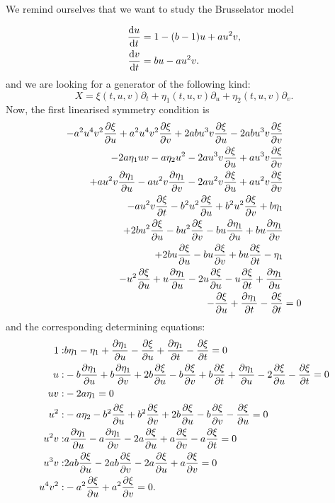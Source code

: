 We remind ourselves that we want to study the Brusselator model

\begin{equation*}
  \begin{split}
    \dv{u}{t}&=1-(b-1)u+au^2 v,\\
    \dv{v}{t}&=bu-au^2 v.\\
    \end{split}
\end{equation*}
and we are looking for a generator of the following kind:
\begin{equation}
X=\xi(t,u,v)\partial_t+\eta_1(t,u,v)\partial_u+\eta_2(t,u,v)\partial_v.
\end{equation}
Now, the first linearised symmetry condition is
\begin{align}
  - a^{2} u^{4} v^{2} \pdv{\xi}{u} + a^{2} u^{4} v^{2} \pdv{\xi}{v} + 2 a b u^{3} v \pdv{\xi}{u} - 2 a b u^{3} v \pdv{\xi}{v}&\nonumber\\
  - 2 a \eta_1 u v - a \eta_2 u^{2} - 2 a u^{3} v \pdv{\xi}{u} + a u^{3} v \pdv{\xi}{v}&\nonumber\\
  + a u^{2} v \pdv{\eta_1}{u} - a u^{2} v \pdv{\eta_1}{v} - 2 a u^{2} v \pdv{\xi}{u} + a u^{2} v \pdv{\xi}{v}&\nonumber\\
  - a u^{2} v \pdv{\xi}{t} - b^{2} u^{2} \pdv{\xi}{u} + b^{2} u^{2} \pdv{\xi}{v} + b \eta_1&\nonumber\\
  + 2 b u^{2} \pdv{\xi}{u} - b u^{2} \pdv{\xi}{v} - b u \pdv{\eta_1}{u} + b u \pdv{\eta_1}{v} &\nonumber\\
  + 2 b u \pdv{\xi}{u} - b u \pdv{\xi}{v} + b u \pdv{\xi}{t} - \eta_1&\nonumber\\
  - u^{2} \pdv{\xi}{u} + u \pdv{\eta_1}{u} - 2 u \pdv{\xi}{u} - u \pdv{\xi}{t} + \pdv{\eta_1}{u}&\nonumber\\
  - \pdv{\xi}{u} + \pdv{\eta_1}{t} - \pdv{\xi}{t}&=0\label{eq:Brusselator_lin_sym_1}
\end{align}
and the corresponding determining equations:
\begin{align*}
1:&b \eta_1 - \eta_1 + \pdv{\eta_1}{u} - \pdv{\xi}{u} + \pdv{\eta_1}{t} - \pdv{\xi}{t}=0\\
u:&- b \pdv{\eta_1}{u} + b \pdv{\eta_1}{v} + 2 b \pdv{\xi}{u} - b \pdv{\xi}{v} + b \pdv{\xi}{t} + \pdv{\eta_1}{u} - 2 \pdv{\xi}{u} - \pdv{\xi}{t}=0\\
u v:&- 2 a \eta_1=0\\
u^{2}:&- a \eta_2 - b^{2} \pdv{\xi}{u} + b^{2} \pdv{\xi}{v} + 2 b \pdv{\xi}{u} - b \pdv{\xi}{v} - \pdv{\xi}{u}=0\\
u^{2} v:&a \pdv{\eta_1}{u} - a \pdv{\eta_1}{v} - 2 a \pdv{\xi}{u} + a \pdv{\xi}{v} - a \pdv{\xi}{t}=0\\
u^{3} v:&2 a b \pdv{\xi}{u} - 2 a b \pdv{\xi}{v} - 2 a \pdv{\xi}{u} + a \pdv{\xi}{v}=0\\
u^{4} v^{2}:&- a^{2} \pdv{\xi}{u} + a^{2} \pdv{\xi}{v}=0.
\end{align*}
